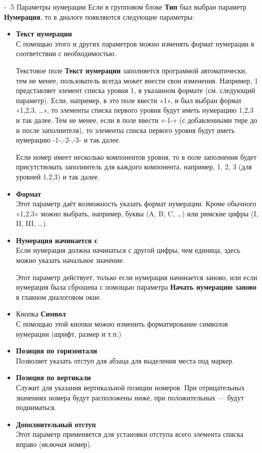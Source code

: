\documentclass[a4paper,10pt]{article}
\makeatletter
\renewcommand\paragraph{%
   \@startsection{paragraph}{4}{0mm}%
      {-\baselineskip}%
      {.5\baselineskip}%
      {\normalfont\normalsize\bfseries}}
\makeatother
\begin{document}
\paragraph{Параметры нумерации}
Если в групповом блоке \textbf{Тип} был выбран параметр \textbf{Нумерация}, то в диалоге появляются следующие параметры:
\begin{itemize}
 \item \textbf{Текст нумерации}\\
 С помощью этого и других параметров можно изменять формат нумерации в соответствии с необходимостью.
 
 Текстовое поле \textbf{Текст нумерации} заполняется программой автоматически, тем не менее, пользователь всегда может внести свои изменения. Например, {1} представляет элемент списка уровня 1, в указанном формате (см. следующий параметр). Если, например, в это поле ввести «{1}», и был выбран формат «1,2,3, …», то элементы списка первого уровня будут иметь нумерацию 1,2,3 и так далее. Тем не менее, если в поле ввести «-{1}-» (с добавленными тире до и после заполнителя), то элементы списка первого уровня будут иметь нумерацию -1-,-2-,-3- и так далее.
 
 Если номер имеет несколько компонентов уровня, то в поле заполнения будет присутствовать заполнитель для каждого компонента, например, {1}, {2}, {3} (для уровней 1,2,3) и так далее.
 \item \textbf{Формат}\\
 Этот параметр даёт возможность указать формат нумерации. Кроме обычного «1,2,3» можно выбрать, например, буквы (A, B, C, …) или римские цифры (I, II, III, …).
 \item \textbf{Нумерация начинается с}\\
 Если нумерация должна начинаться с другой цифры, чем единица, здесь можно указать начальное значение.
 
 Этот параметр действует, только если нумерация начинается заново, или если нумерация была сброшена с помощью параметра \textbf{Начать нумерацию заново} в главном диалоговом окне.
 \item Кнопка \textbf{Символ}\\
 С помощью этой кнопки можно изменить форматирование символов нумерации (шрифт, размер и т.п.)
 \item \textbf{Позиция по горизонтали}\\
 Позволяет указать отступ для абзаца для выделения места под маркер.
 \item \textbf{Позиция по вертикали}\\
 Служит для указания вертикальной позиции номеров. При отрицательных значениях номера будут расположены ниже, при положительных — будут подниматься.
 \item \textbf{Дополнительный отступ}\\
 Этот параметр применяется для установки отступа всего элемента списка вправо (\textit{включая} номер).
\end{itemize}
\end{document}
